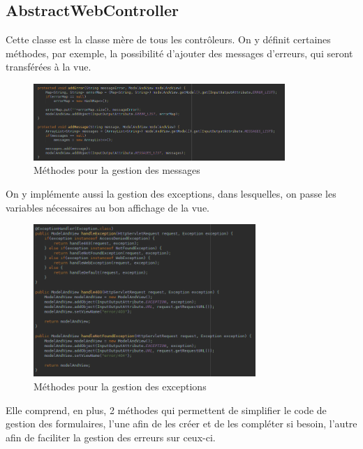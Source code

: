 		\subsection{AbstractWebController}

			Cette classe est la classe mère de tous les contrôleurs. On y définit certaines méthodes, par exemple, la possibilité d'ajouter des messages d'erreurs, qui seront transférées à la vue.

			\begin{figure}[H]
				\centering\includegraphics[width=0.85\textwidth, keepaspectratio]{res/AbstractWebController-messages.png}
				\caption{Méthodes pour la gestion des messages}
			\end{figure}

			\noindent
			On y implémente aussi la gestion des exceptions, dans lesquelles, on passe les variables nécessaires au bon affichage de la vue.

			\begin{figure}[H]
				\centering\includegraphics[width=0.75\textwidth, keepaspectratio]{res/AbstractWebController-exception.png}
				\caption{Méthodes pour la gestion des exceptions}
			\end{figure}

			\newpage
			\noindent
			Elle comprend, en plus, 2 méthodes qui permettent de simplifier le code de gestion des formulaires, l'une afin de les créer et de les compléter si besoin, l'autre afin de faciliter la gestion des erreurs sur ceux-ci.

